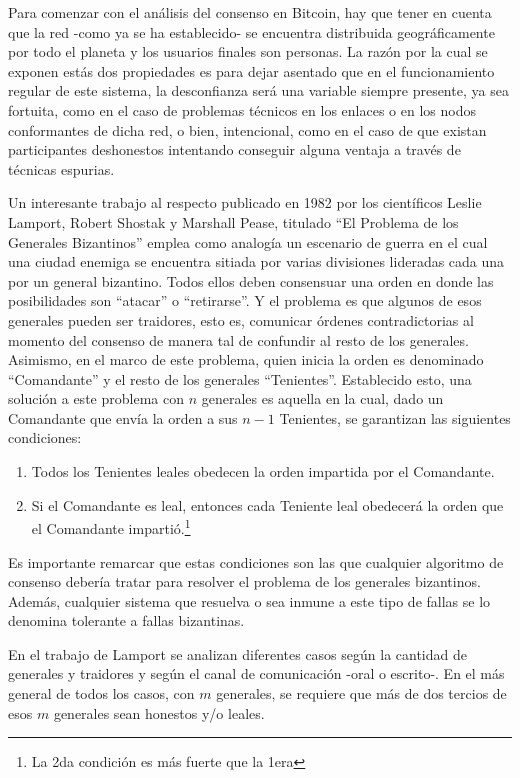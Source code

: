 Para comenzar con el análisis del consenso en Bitcoin, hay que tener en cuenta que la red -como ya se ha establecido- se encuentra distribuida geográficamente por todo el planeta y los usuarios finales son personas. La razón por la cual se exponen estás dos propiedades es para dejar asentado que en el funcionamiento regular de este sistema, la desconfianza será una variable siempre presente, ya sea fortuita, como en el caso de problemas técnicos en los enlaces o en los nodos conformantes de dicha red, o bien, intencional, como en el caso de que existan participantes deshonestos intentando conseguir alguna ventaja a través de técnicas espurias.

Un interesante trabajo al respecto publicado en 1982 por los científicos Leslie Lamport, Robert Shostak y Marshall Pease, titulado ``El Problema de los Generales Bizantinos''\cite{Lamport82thebyzantine} emplea como analogía un escenario de guerra en el cual una ciudad enemiga se encuentra sitiada por varias divisiones lideradas cada una por un general bizantino. Todos ellos deben consensuar una orden en donde las posibilidades son ``atacar'' o ``retirarse''. Y el problema es que algunos de esos generales pueden ser traidores, esto es, comunicar órdenes contradictorias al momento del consenso de manera tal de confundir al resto de los generales. Asimismo, en el marco de este problema, quien inicia la orden es denominado ``Comandante'' y el resto de los generales ``Tenientes''. Establecido esto, una solución a este problema con $n$ generales es aquella en la cual, dado un Comandante que envía la orden a sus $n - 1$ Tenientes, se garantizan las siguientes condiciones:

\begin{enumerate}
  \item Todos los Tenientes leales obedecen la orden impartida por el Comandante.
  \item Si el Comandante es leal, entonces cada Teniente leal obedecerá la orden que el Comandante impartió.\footnote{La 2da condición es más fuerte que la 1era}
\end{enumerate}

Es importante remarcar que estas condiciones son las que cualquier algoritmo de consenso debería tratar para resolver el problema de los generales bizantinos. Además, cualquier sistema que resuelva o sea inmune a este tipo de fallas se lo denomina tolerante a fallas bizantinas.

En el trabajo de Lamport se analizan diferentes casos según la cantidad de generales y traidores y según el canal de comunicación -oral o escrito-. En el más general de todos los casos, con $m$ generales, se requiere que más de dos tercios de esos $m$ generales sean honestos y/o leales.

